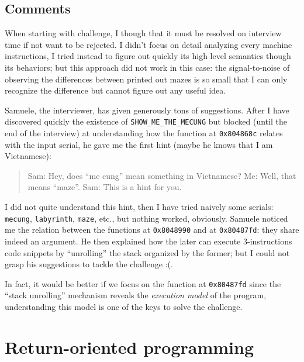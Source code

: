\documentclass{easychair}
\begin{document}
\subsection{Comments}
When starting with challenge, I though that it must be resolved on interview time if not want to be rejected. I didn't focus on detail analyzing every machine instructions, I tried instead to figure out quickly its high level semantics though its behaviors; but this approach did not work in this case: the signal-to-noise of observing the differences between printed out mazes is so small that I can only recognize the difference but cannot figure out any useful idea.

Samuele, the interviewer, has given generously tons of suggestions. After I have discovered quickly the existence of \texttt{SHOW\_ME\_THE\_MECUNG} but blocked (until the end of the interview) at understanding how the function at \texttt{0x804868c} relates with the input serial, he gave me the first hint (maybe he knows that I am Vietnamese):
\begin{quote}
  Sam: Hey, does ``me cung'' mean something in Vietnamese?\newline
  Me: Well, that means ``maze''.\newline
  Sam: This is a hint for you. 
\end{quote}
I did not quite understand this hint, then I have tried naively some serials: \texttt{mecung}, \texttt{labyrinth}, \texttt{maze}, etc., but nothing worked, obviously. Samuele noticed me the relation between the functions at \texttt{0x8048990} and at \texttt{0x80487fd}: they share indeed an argument. He then explained how the later can execute $3$-instructions code snippets by ``unrolling''  the stack organized by the former; but I could not grasp his suggestions to tackle the challenge :(.

In fact, it would be better if we focus on the function at \texttt{0x80487fd} since the ``stack unrolling'' mechanism reveals the \emph{execution model} of the program, understanding this model is one of the keys to solve the challenge.

\section{Return-oriented programming}
\label{sec:detail_analysis}
\end{document}
